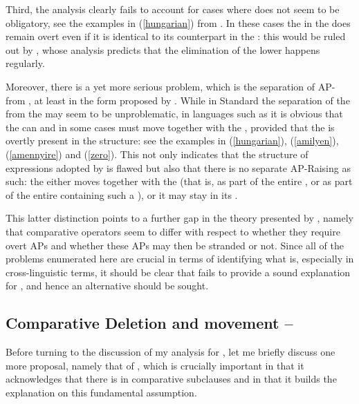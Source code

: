 Third, the analysis clearly fails to account for cases where  does not seem to be obligatory, see the examples in (\ref{hungarian}) from . In these cases the  in the  does remain overt even if it is identical to its counterpart in the : this would be ruled out by \citet{lechner2004}, whose analysis predicts that the elimination of the lower  happens regularly.

Moreover, there is a yet more serious problem, which is the separation of AP- from , at least in the form proposed by \citet{lechner2004}. While in Standard  the separation of the  from the  may seem to be unproblematic, in languages such as  it is obvious that the  can and in some cases must move together with the , provided that the  is overtly present in the structure: see the examples in (\ref{hungarian}), (\ref{amilyen}), (\ref{amennyire}) and (\ref{zero}). This not only indicates that the structure of  expressions adopted by \citet{lechner2004} is flawed but also that there is no separate AP-Raising as such: the  either moves together with the  (that is, as part of the entire , or as part of the entire  containing such a ), or it may stay in its .

This latter distinction points to a further gap in the theory presented by \citet{lechner2004}, namely that comparative operators seem to differ with respect to whether they require overt APs and whether these APs may then be stranded or not. Since all of the problems enumerated here are crucial in terms of identifying what  is, especially in cross-linguistic terms, it should be clear that \citet{lechner2004} fails to provide a sound explanation for , and hence an alternative should be sought.

\subsection{Comparative Deletion and movement -- \citet{kennedy2002}} \label{sec:3movement}
Before turning to the discussion of my analysis for , let me briefly discuss one more proposal, namely that of \citet{kennedy2002}, which is crucially important in that it acknowledges that there is  in comparative subclauses and in that it builds the explanation on this fundamental assumption.

